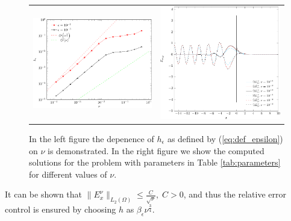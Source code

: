 \begin{figure}
\begin{tabular}{cc}
\includegraphics[height=0.35\textwidth]{pics_frequency_domain/h_nu.pdf}
&
\includegraphics[height=0.35\textwidth]{pics_frequency_domain/res_sol.pdf}
\end{tabular}
\caption{In the left figure the depenence of $h_{\epsilon}$ as defined by (\ref{eq:def_epsilon}) on $\nu$ is demonstrated. 
In the right figure we show the computed solutions for the problem with parameters in Table \ref{tab:parameters} for different values of $\nu$. }
\label{fig:dependence}
\end{figure}


\begin{remark}
It can be shown that $\|E^{\nu}_{x}\|_{L_{2}(\Omega)}\leq \frac{C}{\sqrt{\nu}},\; C>0$, 
and thus the relative error control
\bealn
 \leq \epsilon
\eealn
 is ensured by choosing $h$ as $\beta_{\epsilon}\nu^{\frac{3}{4}}$.
\end{remark}

\FloatBarrier
